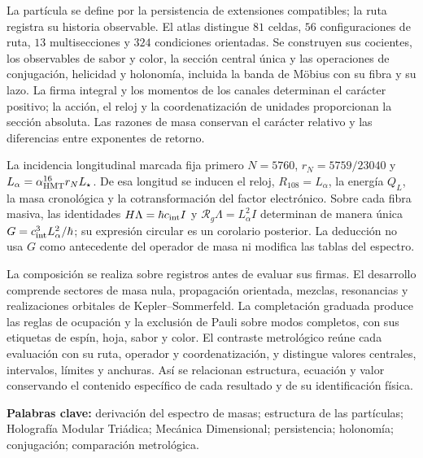 La partícula se define por la persistencia de extensiones compatibles;
la ruta registra su historia observable. El atlas distingue \(81\) celdas,
\(56\) configuraciones de ruta, \(13\) multisecciones y \(324\) condiciones
orientadas. Se construyen sus cocientes, los observables de sabor y color,
la sección central única y las operaciones de conjugación, helicidad y
holonomía, incluida la banda de Möbius con su fibra y su lazo. La firma
integral y los momentos de los canales determinan el carácter positivo;
la acción, el reloj y la coordenatización de unidades proporcionan la sección
absoluta. Las razones de masa conservan el carácter relativo y las
diferencias entre exponentes de retorno.

La incidencia longitudinal marcada fija primero
\(N=5760\), \(r_N=5759/23040\) y
\(L_\alpha=\alpha_{\rm HMT}^{16}r_NL_\star\). De esa longitud se inducen
el reloj, \(R_{108}=L_\alpha\), la energía \(Q_L\), la masa cronológica y
la cotransformación del factor electrónico. Sobre cada fibra masiva, las
identidades \(H\Lambda=\hbar c_{\rm int}I\) y
\(\mathcal R_g\Lambda=L_\alpha^2I\) determinan de manera única
\(G=c_{\rm int}^3L_\alpha^2/\hbar\); su expresión circular es un
corolario posterior. La deducción no usa \(G\) como antecedente del
operador de masa ni modifica las tablas del espectro.

La composición se realiza sobre registros antes de evaluar sus firmas.
El desarrollo comprende sectores de masa nula, propagación orientada,
mezclas, resonancias y realizaciones orbitales de Kepler--Sommerfeld. La
completación graduada produce las reglas de ocupación y la exclusión de
Pauli sobre modos completos, con sus etiquetas de espín, hoja, sabor y
color. El contraste metrológico reúne cada evaluación con su ruta,
operador y coordenatización, y distingue valores centrales, intervalos, límites y
anchuras. Así se relacionan estructura, ecuación y valor conservando el
contenido específico de cada resultado y de su identificación física.

\noindent\textbf{Palabras clave:} derivación del espectro de masas;
estructura de las partículas; Holografía Modular Triádica; Mecánica
Dimensional; persistencia; holonomía; conjugación; comparación metrológica.
\par\endgroup
